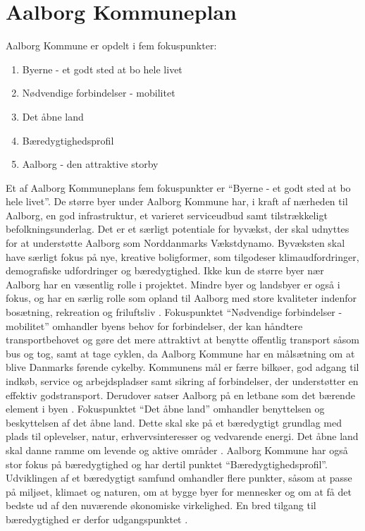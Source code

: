 \section{Aalborg Kommuneplan}
Aalborg Kommune er opdelt i fem fokuspunkter: 
\begin{enumerate}
	\item Byerne - et godt sted at bo hele livet
	\item Nødvendige forbindelser - mobilitet
	\item Det åbne land
	\item Bæredygtighedsprofil
	\item Aalborg - den attraktive storby
\end{enumerate}
Et af Aalborg Kommuneplans fem fokuspunkter er “Byerne - et godt sted at bo hele livet”. De større byer under Aalborg Kommune har, i kraft af nærheden til Aalborg, en god infrastruktur,  et varieret serviceudbud samt tilstrækkeligt befolkningsunderlag. Det er et særligt potentiale for byvækst, der skal udnyttes for at understøtte Aalborg som Norddanmarks Vækstdynamo. 
\newline \indent{     }  Byvæksten skal have særligt fokus på nye, kreative boligformer, som tilgodeser klimaudfordringer, demografiske udfordringer og bæredygtighed. 
\newline \indent{     }  Ikke kun de større byer nær Aalborg har en væsentlig rolle i projektet. Mindre byer og landsbyer er også i fokus, og har en særlig rolle som opland til Aalborg med store kvaliteter indenfor bosætning, rekreation og friluftsliv \citep{byerne}.
\newline
\newline
Fokuspunktet “Nødvendige forbindelser - mobilitet” omhandler byens behov for forbindelser, der kan håndtere transportbehovet og gøre det mere attraktivt at benytte offentlig transport såsom bus og tog, samt at tage cyklen, da  Aalborg Kommune har en målsætning om at blive Danmarks førende cykelby. Kommunens mål er færre bilkøer, god adgang til indkøb, service og arbejdspladser samt sikring af forbindelser, der understøtter en effektiv godstransport. Derudover satser Aalborg på en letbane som det bærende element i byen \citep{mobilitet}.
\newline
\newline
Fokuspunktet “Det åbne land” omhandler benyttelsen og beskyttelsen af det åbne land. Dette skal ske på et bæredygtigt grundlag med plads til oplevelser, natur, erhvervsinteresser og vedvarende energi. Det åbne land skal danne ramme om levende og aktive områder \citep{land}.
\newline
\newline
Aalborg Kommune har også stor fokus på bæredygtighed og har dertil punktet “Bæredygtighedsprofil”. Udviklingen af et bæredygtigt samfund omhandler flere punkter, såsom at passe på miljøet, klimaet og naturen, om at bygge byer for mennesker og om at få det bedste ud af den nuværende økonomiske virkelighed. En bred tilgang til bæredygtighed er derfor udgangspunktet \citep{profil}.


